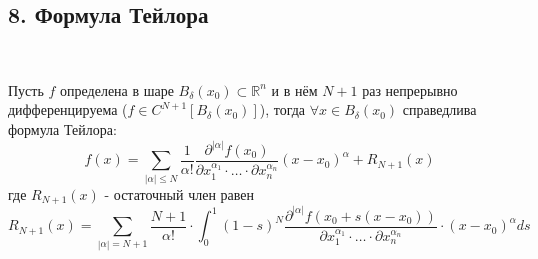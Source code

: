 \documentclass[book, 11pt]{report}
\begin{document}
        \subsection*{8. Формула Тейлора}
        \setcounter{equation}{0}
        \par{\ }
        \par{Пусть $f$ определена в шаре $B_{\delta}(x_0)\subset\mathbb{R}^n$ и в нём $N+1$ раз непрерывно дифференцируема ($f\in C^{N+1}[B_{\delta}(x_0)]$), тогда $\forall x\in B_{\delta}(x_0)$ справедлива формула Тейлора:
        \begin{equation}
            f(x)=\sum_{|\alpha|\leq N}\frac{1}{\alpha!}\frac{\partial^{|\alpha|}f(x_0)}{\partial x_1^{\alpha_1}\cdot\ldots\cdot\partial x_n^{\alpha_n}}(x-x_0)^{\alpha}+R_{N+1}(x)
        \end{equation}
        где $R_{N+1}(x)$ - остаточный член равен
        \begin{equation}
            R_{N+1}(x)=\sum_{|\alpha|=N+1}\frac{N+1}{\alpha!}\cdot\int_0^1(1-s)^N\frac{\partial^{|\alpha|}f(x_0+s(x-x_0))}{\partial x_1^{\alpha_1}\cdot\ldots\cdot\partial x_n^{\alpha_n}}\cdot(x-x_0)^{\alpha}ds
        \end{equation}
        }
        \par
        \noindent\hrulefill\noindent
        \par{\ }
\end{document}

